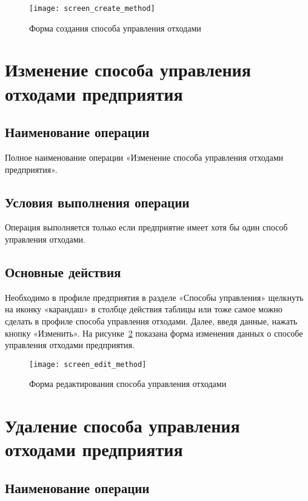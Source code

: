 \documentclass[a4paper]{G2-105}
\begin{document}
\begin{figure}[H]
\centering
\texttt{[image: screen\_create\_method]}
\caption{Форма создания способа управления отходами}
\label{fig:screen_create_method}
\end{figure}

\section{Изменение способа управления отходами предприятия}

\ttl

\subsection{Наименование операции}

Полное наименование операции «Изменение способа управления отходами предприятия».

\subsection{Условия выполнения операции}

Операция выполняется только если предприятие имеет хотя бы один способ управления отходами.

\subsection{Основные действия}

Необходимо в профиле предприятия в разделе «Способы управления» щелкнуть на иконку «карандаш» в столбце действия таблицы или тоже самое можно сделать в профиле способа управления отходами. Далее, введя данные, нажать кнопку «Изменить». На рисунке~\ref{fig:screen_edit_method} показана форма изменения данных о способе управления отходами предприятия.

\begin{figure}[H]
\centering
\texttt{[image: screen\_edit\_method]}
\caption{Форма редактирования способа управления отходами}
\label{fig:screen_edit_method}
\end{figure}

\section{Удаление способа управления отходами предприятия}

\ttl

\subsection{Наименование операции}
\end{document}
